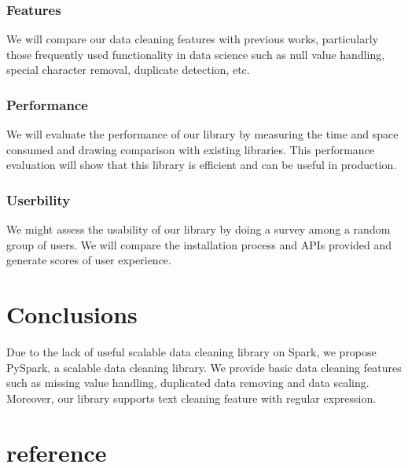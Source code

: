 \documentclass[sigconf]{acmart}
\begin{document}
\subsubsection{Features}
We will compare our data cleaning features with previous works, particularly those frequently used functionality in data science such as null value handling, special character removal, duplicate detection, etc. 
\subsubsection{Performance}
We will evaluate the performance of our library by measuring the time and space consumed and drawing comparison with existing libraries. This performance evaluation will show that this library is efficient and can be useful in production. 
\subsubsection{Userbility}
We might assess the usability of our library by doing a survey among a random group of users. We will compare the installation process and APIs provided and generate scores of user experience.

\section{Conclusions}
Due to the lack of useful scalable data cleaning library on Spark, we propose PySpark, a scalable data cleaning library. We provide basic data cleaning features such as missing value handling, duplicated data removing and data scaling. Moreover, our library supports text cleaning feature with regular expression.

\section{reference}


\end{document}
